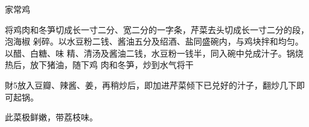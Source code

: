\begin{recipe}{家常鸡}

\ingredients


\cooking

将鸡肉和冬笋切成长一寸二分、宽二分的一字条，芹菜去头切成长一寸二分的段，泡海椒
剁碎。以水豆粉二钱、酱油五分及绍酒、盐同盛碗内，与鸡块拌和均匀。以醋、白糖、味
精、清汤及酱油二钱，水豆粉一钱半，同入碗中兑成汁子。锅烧热后，放下猪油，随下鸡
肉和冬笋，炒到水气将干

財5放入豆瓣、辣酱、姜，再稍炒后，即加进芹菜倾下已兑好的汁子，翻炒几下即可起锅。

\features

此菜极鲜嫩，带荔枝味。

\end{recipe}

